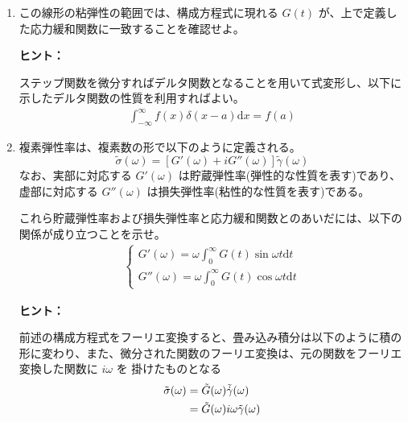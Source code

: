 \documentclass[uplatex,dvipdfmx,a4paper,11pt]{jsarticle}
\newcommand{\diff}{\mathrm d}
\begin{document}
\begin{enumerate}
\setlength{\parskip}{0cm} %
\setlength{\itemsep}{0.5cm} %

\item
この線形の粘弾性の範囲では、構成方程式に現れる $G(t)$ が、上で定義した応力緩和関数に一致することを確認せよ。

\begin{itembox}[l]{{\bf ヒント：}}

ステップ関数を微分すればデルタ関数となることを用いて式変形し、以下に示したデルタ関数の性質を利用すればよい。
\begin{align*}
\int_{-\infty}^{\infty} f(x) \delta(x - a) \diff x = f(a)
\end{align*}

\end{itembox}

\item
複素弾性率は、複素数の形で以下のように定義される。
\begin{equation*}
\tilde{\sigma}(\omega) = [G'(\omega) + i G''(\omega)] \tilde{\gamma}(\omega)
\end{equation*}
なお、実部に対応する $G'(\omega)$ は貯蔵弾性率(弾性的な性質を表す)であり、虚部に対応する $G''(\omega)$ は損失弾性率(粘性的な性質を表す)である。

これら貯蔵弾性率および損失弾性率と応力緩和関数とのあいだには、以下の関係が成り立つことを示せ。
\begin{align*}
\begin{cases}
\displaystyle G' (\omega) = \omega \int_0^{\infty} G(t) \sin \omega t \diff t \\[8pt]
\displaystyle G'' (\omega) = \omega \int_0^{\infty} G(t) \cos \omega t \diff t
\end{cases}
\end{align*}

\begin{itembox}[l]{{\bf ヒント：}}

前述の構成方程式をフーリエ変換すると、畳み込み積分は以下のように積の形に変わり、また、微分された関数のフーリエ変換は、元の関数をフーリエ変換した関数に $i\omega$ を 掛けたものとなる
\begin{align*}
\tilde{\sigma}(\omega) 
	&= \tilde{G} (\omega) \tilde{\dot{\gamma}}(\omega) \notag \\
	&= \tilde{G} (\omega) i\omega \tilde{\gamma}(\omega)
\end{align*}


\end{itembox}
\end{enumerate}
\end{document}
